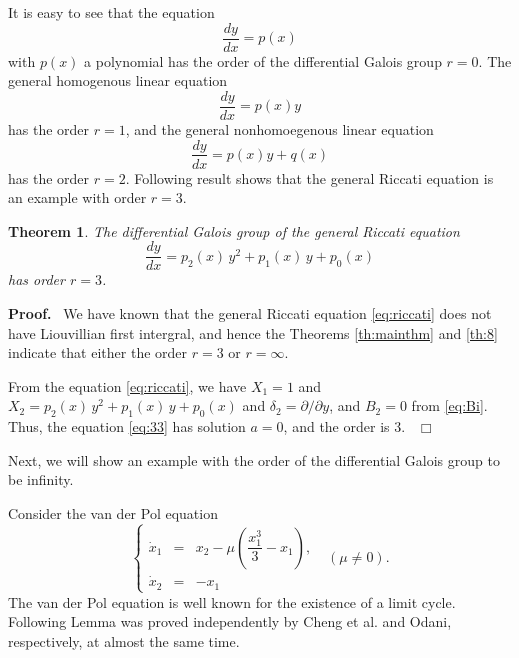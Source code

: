 \documentclass[preprint, 12pt]{elsarticle}
\newtheorem{thm}{Theorem}[section]
\numberwithin{equation}{section}
\newenvironment{proof}[1][Proof]{\textbf{#1.}\ }{\ $\Box$}
\begin{document}
It is easy to see that the equation
\begin{equation}
\frac{d y}{d x} = p(x)
\end{equation} 
with $p(x)$ a polynomial has the order of the differential Galois group $r = 0$. The general homogenous linear equation
\begin{equation}
\frac{d y}{d x} = p(x) y
\end{equation}
has the order $r = 1$, and the general nonhomoegenous linear equation
\begin{equation}
\frac{d y}{d x} = p(x) y + q(x)
\end{equation}
has the order $r = 2$. Following result shows that the general Riccati equation is an example with order $r = 3$.
\begin{thm}
\label{cor:3} The differential Galois group of the general Riccati
equation
\begin{equation}
\label{eq:riccati}
\frac{d y}{d x} = p_2(x)\,y^2 + p_1(x)\,y + p_0(x)
\end{equation}
has order $r = 3$.
\end{thm}
\begin{proof} We have known that the general Riccati equation \eqref{eq:riccati} does not have Liouvillian first intergral\cite{L:41}, and hence the Theorems \ref{th:mainthm} and \ref{th:8} indicate that either the order $r =3$ or $r = \infty$. 

From the equation \eqref{eq:riccati}, we have $X_1 = 1$ and $X_2 = p_2(x)\,y^2 + p_1(x)\,y + p_0(x)$
and $\delta_2 = \partial/\partial y$, and $B_2 = 0$ from \eqref{eq:Bi}. Thus, the equation \eqref{eq:33} has solution $a = 0$, and the order is $3$.
\end{proof}

Next, we will show an example with the order of the differential Galois group to be infinity.

Consider the van der Pol equation
\begin{equation}
\label{vdp} \left\{\begin{array}{rcl} \dot{x}_1 &=& x_2 - \mu
(\dfrac{x_1^3}{3} - x_1),\\
\dot{x}_2 &=& -x_1 \end{array}\right.
 \ \ \ (\mu \not = 0).
\end{equation}
The van der Pol equation is well known for the existence of a limit cycle. 
Following Lemma was proved independently by Cheng et al.\cite{Cheng:95} and Odani\cite{Oda:95}, respectively, at almost the same time. 
\end{document}
